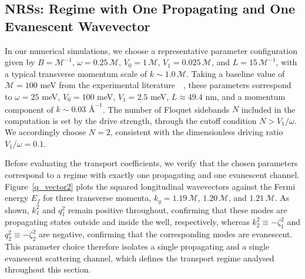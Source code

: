 \documentclass[aps,prb,onecolumn,longbibliography,nofootinbib,citeautoscript,10pt]{revtex4-2}
\begin{document}
\subsection{NRSs: Regime with One Propagating and One Evanescent Wavevector}

In our numerical simulations, we choose a representative parameter configuration given by $B = \mathcal{M}^{-1}$, $\omega = 0.25\,\mathcal{M}$, $V_0 = 1\,\mathcal{M}$, $V_1 = 0.025\,\mathcal{M}$, and $L = 15\,\mathcal{M}^{-1}$, with a typical transverse momentum scale of $k \sim 1.0\,\mathcal{M}$. Taking a baseline value of $\mathcal{M} = 100$ meV from the experimental literature~\cite{fu_nodal19, schilling2017flat} \,,  these parameters correspond to $\omega = 25$ meV, $V_0 = 100$ meV, $V_1 = 2.5$ meV, $L \approx 49.4$ nm, and a momentum component of $k \sim 0.03\text{ \AA}^{-1}$. The number of Floquet sidebands $N$ included in the computation is set by the drive strength, through the cutoff condition $N > V_1/\omega$. We accordingly choose $N = 2$, consistent with the dimensionless driving ratio $V_1/\omega = 0.1$.

Before evaluating the transport coefficients, we verify that the chosen parameters correspond to a regime with exactly one propagating and one evanescent channel. Figure~\ref{q_vector2} plots the squared longitudinal wavevectors against the Fermi energy $E_f$ for three transverse momenta, $k_y = 1.19\,\mathcal{M}$, $1.20\,\mathcal{M}$, and $1.21\,\mathcal{M}$. As shown, $k_1^2$ and $q_1^2$ remain positive throughout, confirming that these modes are propagating states outside and inside the well, respectively, whereas $k_2^2 \equiv -\zeta_1^2$ and $q_2^2 \equiv -\zeta_2^2$ are negative, confirming that the corresponding modes are evanescent. This parameter choice therefore isolates a single propagating and a single evanescent scattering channel, which defines the transport regime analysed throughout this section.
\end{document}
